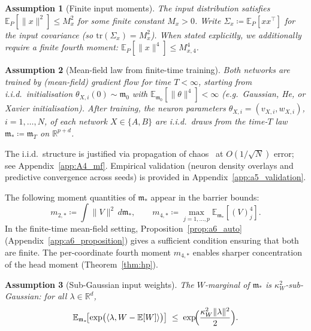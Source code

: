 \documentclass[11pt]{article}
\newtheorem{assumption}{Assumption}
\newcommand{\R}{\mathbb{R}}
\newcommand{\E}{\mathbb{E}}
\begin{document}
\begin{assumption}[Finite input moments]\label{ass:input_mom}
The input distribution satisfies $\E_P[\|x\|^2] \le M_x^2$
for some finite constant $M_x > 0$.
Write $\Sigma_x \coloneqq \E_P[xx^\top]$ for the input covariance
(so $\mathrm{tr}(\Sigma_x) = M_x^2$).
When stated explicitly, we additionally require a finite fourth moment:
$\E_P[\|x\|^4] \le M_{x,4}^4$.
\end{assumption}

\begin{assumption}[Mean-field law from finite-time training]\label{ass:mf_law}
Both networks are trained by (mean-field) gradient flow for time
$T < \infty$, starting from i.i.d.\ initialisation
$\theta_{X,i}(0) \sim \mathfrak{m}_0$ with
$\E_{\mathfrak{m}_0}[\|\theta\|^4] < \infty$
(e.g.\ Gaussian, He, or Xavier initialisation).
After training, the neuron parameters $\theta_{X,i} = (v_{X,i}, w_{X,i})$,
$i=1,\ldots,N$, of each network $X \in \{A, B\}$ are i.i.d.\ draws
from the time-$T$ law $\mathfrak{m}_* \coloneqq \mathfrak{m}_T$ on
$\R^{p+d}$.
\end{assumption}

The i.i.d.\ structure is justified via propagation of
chaos~\cite{mei2018meanfield,rotskoff2022,debortoli2020} at
$O(1/\sqrt{N})$ error; see Appendix~\ref{app:A4_mf}.
Empirical validation (neuron density overlays and predictive
convergence across seeds) is provided in
Appendix~\ref{app:a5_validation}.

The following moment quantities of $\mathfrak{m}_*$ appear in the
barrier bounds:
\begin{equation}\label{eq:moment_defs}
  m_{2,*} \coloneqq \int\!\|V\|^2\,d\mathfrak{m}_*,
  \qquad
  m_{4,*} \coloneqq \max_{j=1,\ldots,p}
    \E_{\mathfrak{m}_*}[(V)_j^4].
\end{equation}
In the finite-time mean-field setting, Proposition~\ref{prop:a6_auto}
(Appendix~\ref{app:a6_proposition}) gives a sufficient condition
ensuring that both are finite.
The per-coordinate fourth moment $m_{4,*}$ enables sharper
concentration of the head moment (Theorem~\ref{thm:hp}).

\begin{assumption}[Sub-Gaussian input weights]\label{ass:subgauss}
The $W$-marginal of $\mathfrak{m}_*$ is
$\kappa_W^2$-sub-Gaussian:
for all $\lambda \in \R^d$,
\[
  \E_{\mathfrak{m}_*}\!\bigl[\exp\bigl(\langle\lambda, W - \E[W]\rangle\bigr)\bigr]
  \;\le\; \exp\!\Bigl(\frac{\kappa_W^2\|\lambda\|^2}{2}\Bigr).
\]
\end{assumption}
\end{document}
